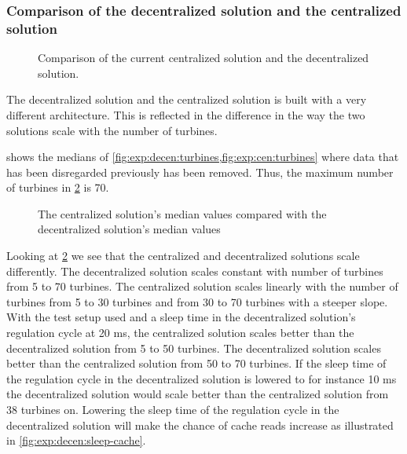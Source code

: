 \clearpage
\subsubsection{Comparison of the decentralized solution and the centralized solution}
\label{sec:comp:decentralizedVScentralized}

\begin{figure}[!h]
	\centering
	
	\caption[Comparison of the current centralized solution and the decentralized solution]{
		\label{fig:projectDiffOverviewCentralizedDecentralized1}
		\footnotesize{%
			Comparison of the current centralized solution and the decentralized solution.
		}
	}
\end{figure}

The decentralized solution and the centralized solution is built with a very different architecture. This is reflected in the difference in the way the two solutions scale with the number of turbines.

 shows the medians of \cref{fig:exp:decen:turbines,fig:exp:cen:turbines} where data that has been disregarded previously has been removed. Thus, the maximum number of turbines in \cref{fig:exp:cenVSDecen} is 70. 

\begin{figure}[h!]
	\centering
		
	\caption{The centralized solution's median values compared with the decentralized solution's median values}
	\label{fig:exp:cenVSDecen}
\end{figure}

Looking at \cref{fig:exp:cenVSDecen} we see that the centralized and decentralized solutions scale differently.
The decentralized solution scales constant with number of turbines from 5 to 70 turbines. The centralized solution scales linearly with the number of turbines from 5 to 30 turbines and from 30 to 70 turbines with a steeper slope. With the test setup used and a sleep time in the decentralized solution's regulation cycle at 20 ms, the centralized solution scales better than the decentralized solution from 5 to 50 turbines. The decentralized solution scales better than the centralized solution from 50 to 70 turbines.
If the sleep time of the regulation cycle in the decentralized solution is lowered to for instance 10 ms the decentralized solution would scale better than the centralized solution from 38 turbines on. Lowering the sleep time of the regulation cycle in the decentralized solution will make the chance of cache reads increase as illustrated in \cref{fig:exp:decen:sleep-cache}.

